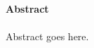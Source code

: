 \documentclass[twoside, 10pt]{book}
\numberwithin{equation}{chapter} %
\numberwithin{figure}{chapter}
\begin{document}
\setcounter{page}{1}


\noindent \textbf{{\Large Abstract}}
\paragraph{}
Abstract goes here.


\tableofcontents

\cleardoublepage


\nocite{*}
{}



\appendix

\end{document}
